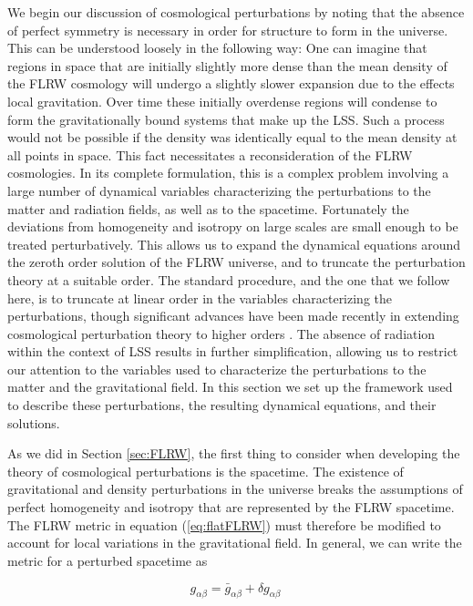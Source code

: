 \documentclass[10pt,letterpaper,final]{iopart}
\numberwithin{equation}{subsection}
\begin{document}
We begin our discussion of cosmological perturbations by noting that the absence of perfect symmetry is necessary in order for structure to form in the universe. This can be understood loosely in the following way: One can imagine that regions in space that are initially slightly more dense than the mean density of the FLRW cosmology  will undergo a slightly slower expansion due to the effects local gravitation. Over time these initially overdense regions will condense to form the gravitationally bound systems that make up the LSS. Such a process would not be possible if the density was identically equal to the mean density at all points in space. This fact necessitates a reconsideration of the FLRW cosmologies. In its complete formulation, this is a complex problem involving a large number of dynamical variables characterizing the perturbations to the matter and radiation fields, as well as to the spacetime.  Fortunately the deviations from homogeneity and isotropy on large scales are small enough to be treated perturbatively. This allows us to expand the dynamical equations around the zeroth order solution of the FLRW universe, and to truncate the perturbation theory at a suitable order. The standard procedure, and the one that we follow here, is to truncate at linear order in the variables characterizing the perturbations, though significant advances have been made recently in extending cosmological perturbation theory to higher orders \cite{Bernardeau}\cite{PT1}\cite{PT2}\cite{PT3}. The absence of radiation within the context of LSS results in further simplification, allowing us to restrict our attention to the variables used to characterize the perturbations to the matter and the gravitational field. In this section we set up the framework used to describe these perturbations, the resulting dynamical equations, and their solutions.

As we did in Section \ref{sec:FLRW}, the first thing to consider when developing the theory of cosmological perturbations is the spacetime. The existence of gravitational and density perturbations in the universe breaks the assumptions of perfect homogeneity and isotropy that are represented by the FLRW spacetime. The FLRW metric in equation (\ref{eq:flatFLRW}) must therefore be modified to account for local variations in the gravitational field. In general, we can write the metric for a perturbed spacetime as

\begin{equation}\label{eq:metric_pert}
g_{\alpha\beta} = \bar{g}_{\alpha\beta} + \delta g_{\alpha\beta} \ 
\end{equation}
\end{document}
